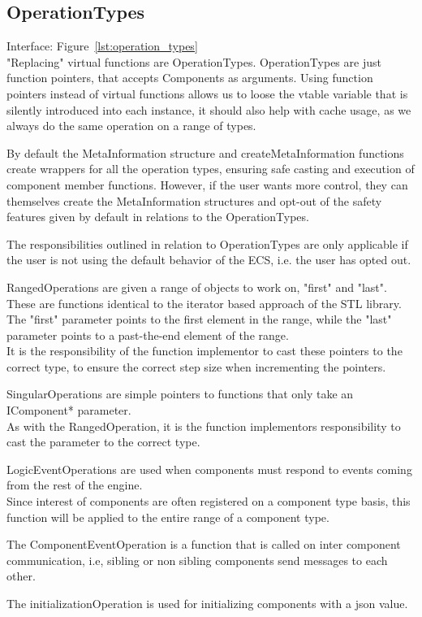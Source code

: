 \subsection{OperationTypes}
Interface: Figure~\ref{lst:operation_types}\\\noindent
"Replacing" virtual functions are OperationTypes.
OperationTypes are just function pointers, that accepts Components as arguments.
Using function pointers instead of virtual functions allows us to loose
the vtable variable that is silently introduced into each instance,
it should also help with cache usage, as we always do the same operation on a range of types.

By default the MetaInformation structure and createMetaInformation functions 
create wrappers for all the operation types, ensuring safe casting and execution of component member functions.
However, if the user wants more control, they can themselves create the MetaInformation structures and opt-out of the safety features given by default in relations to the OperationTypes.

The responsibilities outlined in relation to OperationTypes are only applicable if the user is not using the default behavior of the ECS, i.e. the user has opted out.

RangedOperations are given a range of objects to work on, "first" and "last".
These are functions identical to the iterator based approach of the STL library.\\
The "first" parameter points to the first element in the range, while the "last" parameter points to a past-the-end element of the range.\\
It is the responsibility of the function implementor to cast these pointers to the correct type, 
to ensure the correct step size when incrementing the pointers.

SingularOperations are simple pointers to functions that only take an IComponent* parameter.\\
As with the RangedOperation, it is the function implementors responsibility to cast the parameter to the correct type.

LogicEventOperations are used when components must respond to events coming from the rest of the engine.\\
Since interest of components are often registered on a component type basis,
this function will be applied to the entire range of a component type.

The ComponentEventOperation is a function that is called on inter component communication, i.e, 
sibling or non sibling components send messages to each other.

The initializationOperation is used for initializing components with a json value.
